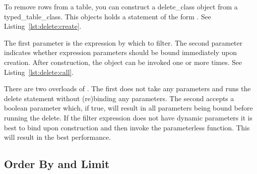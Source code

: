 To remove rows from a table, you can construct a \gls{delete_class} object from a \gls{typed_table_class}. This objects holds a statement of the form \newline {}. See Listing~\ref{lst:delete:create}.



The first parameter is the expression by which to filter. The second parameter indicates whether expression parameters should be bound immediately upon creation. After construction, the object can be invoked one or more times. See Listing~\ref{lst:delete:call}.



There are two overloads of . The first does not take any parameters and runs the delete statement without (re)binding any parameters. The second accepts a boolean parameter which, if true, will result in all parameters being bound before running the delete. If the filter expression does not have dynamic parameters it is best to bind upon construction and then invoke the parameterless function. This will result in the best performance.

\subsection{Order By and Limit}
